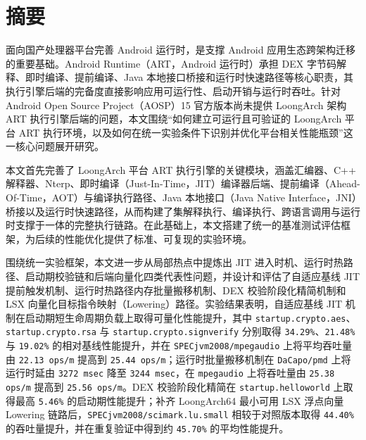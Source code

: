 \maketitle
\MAKETITLE
\makedeclaration

\intobmk\chapter*{\texorpdfstring{摘\quad 要}{摘要}}%
\setcounter{page}{1}%

面向国产处理器平台完善 Android 运行时，是支撑 Android 应用生态跨架构迁移的重要基础。Android Runtime（ART，Android 运行时）承担 DEX 字节码解释、即时编译、提前编译、Java 本地接口桥接和运行时快速路径等核心职责，其执行引擎后端的完备度直接影响应用可运行性、启动开销与运行时吞吐。针对 Android Open Source Project（AOSP）15 官方版本尚未提供 LoongArch 架构 ART 执行引擎后端的问题，本文围绕“如何建立可运行且可验证的 LoongArch 平台 ART 执行环境，以及如何在统一实验条件下识别并优化平台相关性能瓶颈”这一核心问题展开研究。

本文首先完善了 LoongArch 平台 ART 执行引擎的关键模块，涵盖汇编器、C++ 解释器、Nterp、即时编译（Just-In-Time，JIT）编译器后端、提前编译（Ahead-Of-Time，AOT）与编译执行路径、Java 本地接口（Java Native Interface，JNI）桥接以及运行时快速路径，从而构建了集解释执行、编译执行、跨语言调用与运行时支撑于一体的完整执行链路。在此基础上，本文搭建了统一的基准测试评估框架，为后续的性能优化提供了标准、可复现的实验环境。

围绕统一实验框架，本文进一步从局部热点中提炼出 JIT 进入时机、运行时热路径、启动期校验链和后端向量化四类代表性问题，并设计和评估了自适应基线 JIT 提前触发机制、运行时热路径内存批量搬移机制、DEX 校验阶段化精简机制和 LSX 向量化目标指令映射（Lowering）路径。实验结果表明，自适应基线 JIT 机制在启动期短生命周期负载上取得可量化性能提升，其中 \texttt{startup.crypto.aes}、\texttt{startup.crypto.rsa} 与 \texttt{startup.crypto.signverify} 分别取得 \texttt{34.29\%}、\texttt{21.48\%} 与 \texttt{19.02\%} 的相对基线性能提升，并在 \texttt{SPECjvm2008/mpegaudio} 上将平均吞吐量由 \texttt{22.13\,ops/m} 提高到 \texttt{25.44\,ops/m}；运行时批量搬移机制在 \texttt{DaCapo/pmd} 上将运行时延由 \texttt{3272\,msec} 降至 \texttt{3244\,msec}，在 \texttt{mpegaudio} 上将吞吐量由 \texttt{25.38\,ops/m} 提高到 \texttt{25.56\,ops/m}。DEX 校验阶段化精简在 \texttt{startup.helloworld} 上取得最高 \texttt{5.46\%} 的启动期性能提升；补齐 LoongArch64 最小可用 LSX 浮点向量 Lowering 链路后，\texttt{SPECjvm2008/scimark.lu.small} 相较于对照版本取得 \texttt{44.40\%} 的吞吐量提升，并在重复验证中得到约 \texttt{45.70\%} 的平均性能提升。

